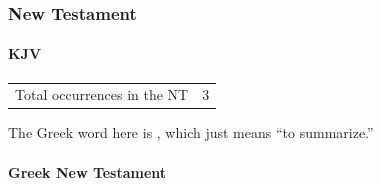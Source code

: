 		
		
	\subsubsection{New Testament} %
		\label{COMPREHEND-NT}
	
		\paragraph{KJV}
			\label{COMPREHEND-NT-KJV}
			
	
			\begin{tabular}{ll}
				Total occurrences in the NT & 3
			\end{tabular}
			
			\begin{compactdesc}
				\item[{\hyperref[JOHN-1-5]{John 1:5}}]
				\item[{\hyperref[ROMANS-13-9]{Romans 13:9}}]
					\begin{compactitem}
						\item The Greek word here is , which just means ``to summarize.''
					\end{compactitem}
				\item[{\hyperref[EPHESIANS-3-18]{Ephesians 3:18}}]
			\end{compactdesc}
			
		\paragraph{Greek New Testament} %
			\label{COMPREHEND-GREEK}
		
			\subparagraph{\texorpdfstring{}{}}
				\label{KATALAMBANO}
			
